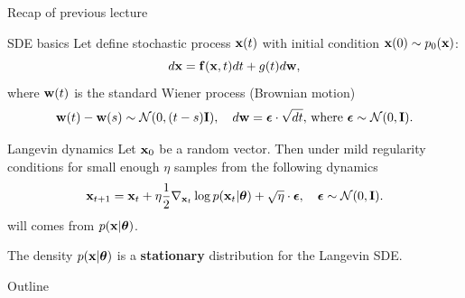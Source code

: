 \begin{frame}{Recap of previous lecture}
	\vspace{-0.2cm}
	\begin{block}{SDE basics}
		Let define stochastic process $\mathbf{x}(t)$ with initial condition $\mathbf{x}(0) \sim p_0(\mathbf{x})$:
		\[
			d\mathbf{x} = \mathbf{f}(\mathbf{x}, t) dt + g(t) d \mathbf{w}, 
		\]
		where $\mathbf{w}(t)$ is the standard Wiener process (Brownian motion)
		\vspace{-0.2cm}
		\[		
			\mathbf{w}(t) - \mathbf{w}(s) \sim \mathcal{N}(0, (t - s) \mathbf{I}), \quad d \mathbf{w} = \boldsymbol{\epsilon} \cdot \sqrt{dt}, \, \text{where } \boldsymbol{\epsilon} \sim \mathcal{N}(0, \mathbf{I}).
		\]
	\end{block}
	\vspace{-0.5cm}
	\begin{block}{Langevin dynamics}
		Let $\mathbf{x}_0$ be a random vector. Then under mild regularity conditions for small enough $\eta$ samples from the following dynamics
		\vspace{-0.2cm}
		\[
			\mathbf{x}_{t + 1} = \mathbf{x}_t + \eta \frac{1}{2} \nabla_{\mathbf{x}_t} \log p(\mathbf{x}_t | \boldsymbol{\theta}) + \sqrt{\eta} \cdot \boldsymbol{\epsilon}, \quad \boldsymbol{\epsilon} \sim \mathcal{N}(0, \mathbf{I}).
		\]
		will comes from $p(\mathbf{x} | \boldsymbol{\theta})$.
	\end{block}
	The density $p(\mathbf{x} | \boldsymbol{\theta})$ is a \textbf{stationary} distribution for the Langevin SDE.
\end{frame}
\begin{frame}{Outline}
	\tableofcontents
\end{frame}

